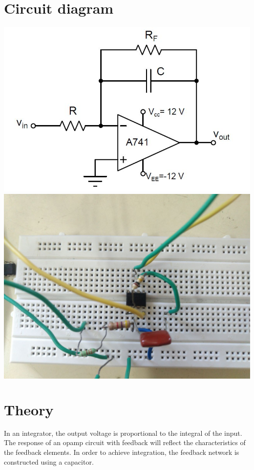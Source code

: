 \documentclass[12pt, titlepage]{article}
\theoremstyle{definition}
\begin{document}
  \section*{Circuit diagram}
    \includegraphics[scale=0.5]{circuit}\\
    \includegraphics[scale=0.25]{practical_circuit}


  \newpage
  \section{Theory}
    In an integrator, the output voltage is proportional to the integral of the input.
    The response of an opamp circuit with feedback will reflect the characteristics of the feedback elements.
    In order to achieve integration, the feedback network is constructed using a capacitor.
\end{document}
